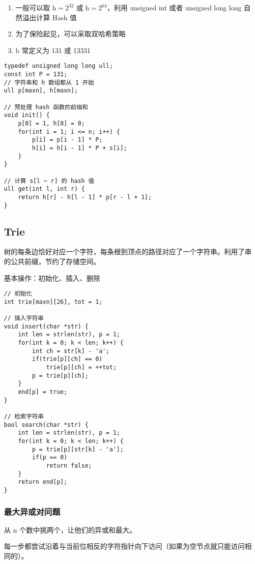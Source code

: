 \documentclass[UTF8]{article}
\begin{document}
\begin{enumerate}
	\item 一般可以取 $\mathrm{h = 2 ^ {32}}$ 或 $\mathrm{h = 2^{64}}$，利用 unsigned int 或者 unsigned long long 自然溢出计算 Hash 值
	\item 为了保险起见，可以采取双哈希策略
	\item $\mathrm{b}$ 常定义为 131 或 13331
\end{enumerate}

\begin{lstlisting}[caption=字符串哈希]
typedef unsigned long long ull;
const int P = 131;
// 字符串和 h 数组都从 1 开始
ull p[maxn], h[maxn];

// 预处理 hash 函数的前缀和
void init() {
	p[0] = 1, h[0] = 0;
	for(int i = 1; i <= n; i++) {
		p[i] = p[i - 1] * P;
		h[i] = h[i - 1] * P + s[i]; 
	}
}

// 计算 s[l ~ r] 的 hash 值
ull get(int l, int r) {
	return h[r] - h[l - 1] * p[r - l + 1];
}
\end{lstlisting}



\subsection{Trie}
树的每条边恰好对应一个字符，每条根到顶点的路径对应了一个字符串。利用了串的公共前缀，节约了存储空间。

基本操作：初始化、插入、删除

\begin{lstlisting}[caption=Trie]
// 初始化
int trie[maxn][26], tot = 1;

// 插入字符串
void insert(char *str) {
	int len = strlen(str), p = 1;
	for(int k = 0; k < len; k++) {
		int ch = str[k] - 'a';
		if(trie[p][ch] == 0)
			trie[p][ch] = ++tot;
		p = trie[p][ch];
	}
	end[p] = true;
}

// 检索字符串
bool search(char *str) {
	int len = strlen(str), p = 1;
	for(int k = 0; k < len; k++) {
		p = trie[p][str[k] - 'a'];
		if(p == 0)
			return false;
	}
	return end[p];
}
\end{lstlisting}

\subsubsection{最大异或对问题}
从 $\mathrm{n}$ 个数中挑两个，让他们的异或和最大。

每一步都尝试沿着与当前位相反的字符指针向下访问（如果为空节点就只能访问相同的）。
\end{document}
